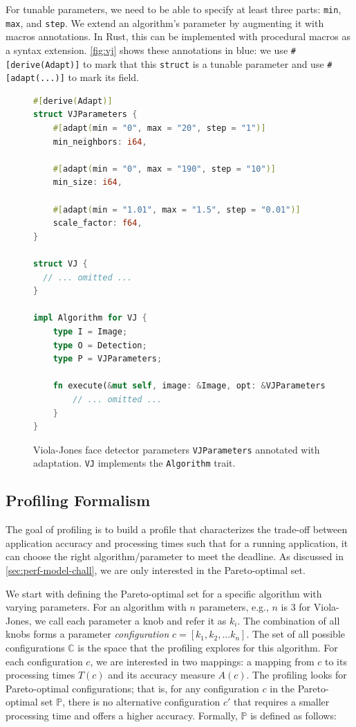 For tunable parameters, we need to be able to specify at least three parts:
\texttt{min}, \texttt{max}, and \texttt{step}. We extend an algorithm's
parameter by augmenting it with macros annotations. In Rust, this can be
implemented with procedural macros as a syntax extension. \autoref{fig:vj} shows
these annotations in blue: we use \texttt{\#[derive(Adapt)]} to mark that this
\texttt{struct} is a tunable parameter and use \texttt{\#[adapt(...)]} to mark
its field.

\begin{figure}
  \centering
\begin{lstlisting}[language=Rust]
#[derive(Adapt)]
struct VJParameters {
    #[adapt(min = "0", max = "20", step = "1")]
    min_neighbors: i64,

    #[adapt(min = "0", max = "190", step = "10")]
    min_size: i64,

    #[adapt(min = "1.01", max = "1.5", step = "0.01")]
    scale_factor: f64,
}

struct VJ {
  // ... omitted ...
}

impl Algorithm for VJ {
    type I = Image;
    type O = Detection;
    type P = VJParameters;

    fn execute(&mut self, image: &Image, opt: &VJParameters) -> Detection {
        // ... omitted ...
    }
}
\end{lstlisting}
  \caption{Viola-Jones face detector parameters \texttt{VJParameters} annotated
    with adaptation. \texttt{VJ} implements the \texttt{Algorithm} trait.}
  \label{fig:vj}
\end{figure}

\subsection{Profiling Formalism}
\label{sec:profiling-formalism}

The goal of profiling is to build a profile that characterizes the trade-off
between application accuracy and processing times such that for a running
application, it can choose the right algorithm/parameter to meet the
deadline. As discussed in \autoref{sec:perf-model-chall}, we are only interested
in the Pareto-optimal set.

We start with defining the Pareto-optimal set for a specific algorithm with
varying parameters. For an algorithm with $n$ parameters, e.g., $n$ is 3 for
Viola-Jones, we call each parameter a knob and refer it as $k_i$. The
combination of all knobs forms a parameter \textit{configuration}
$c = [k_{1}, k_{2}, ... k_{n}]$. The set of all possible configurations
$\mathbb{C}$ is the space that the profiling explores for this algorithm. For
each configuration $c$, we are interested in two mappings: a mapping from $c$ to
its processing times $T(c)$ and its accuracy measure $A(c)$.  The profiling
looks for Pareto-optimal configurations; that is, for any configuration $c$ in
the Pareto-optimal set $\mathbb{P}$, there is no alternative configuration $c'$
that requires a smaller processing time and offers a higher accuracy. Formally,
$\mathbb{P}$ is defined as follows:

